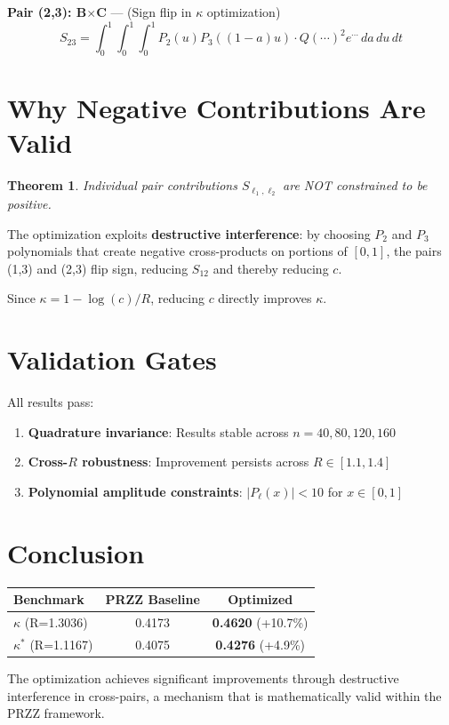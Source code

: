 \documentclass[11pt]{article}
\newtheorem{theorem}{Theorem}
\begin{document}
\textbf{Pair (2,3): B$\times$C} --- \textcolor{signflip}{(Sign flip in $\kappa$ optimization)}
\begin{equation}
S_{23} = \int_0^1 \int_0^1 \int_0^1 P_2(u) P_3((1-a)u) \cdot Q(\cdots)^2 e^{\cdots} \, da\, du\, dt
\end{equation}

\section{Why Negative Contributions Are Valid}

\begin{theorem}
Individual pair contributions $S_{\ell_1,\ell_2}$ are NOT constrained to be positive.
\end{theorem}

The optimization exploits \textbf{destructive interference}: by choosing $P_2$ and $P_3$ polynomials that create negative cross-products on portions of $[0,1]$, the pairs (1,3) and (2,3) flip sign, reducing $S_{12}$ and thereby reducing $c$.

Since $\kappa = 1 - \log(c)/R$, reducing $c$ directly improves $\kappa$.

\section{Validation Gates}

All results pass:
\begin{enumerate}
\item \textbf{Quadrature invariance}: Results stable across $n = 40, 80, 120, 160$
\item \textbf{Cross-$R$ robustness}: Improvement persists across $R \in [1.1, 1.4]$
\item \textbf{Polynomial amplitude constraints}: $|P_\ell(x)| < 10$ for $x \in [0,1]$
\end{enumerate}

\section{Conclusion}

\begin{center}
\begin{tabular}{lcc}
\toprule
Benchmark & PRZZ Baseline & Optimized \\
\midrule
$\kappa$ (R=1.3036) & 0.4173 & \textbf{0.4620} (+10.7\%) \\
$\kappa^*$ (R=1.1167) & 0.4075 & \textbf{0.4276} (+4.9\%) \\
\bottomrule
\end{tabular}
\end{center}

The optimization achieves significant improvements through destructive interference in cross-pairs, a mechanism that is mathematically valid within the PRZZ framework.
\end{document}
